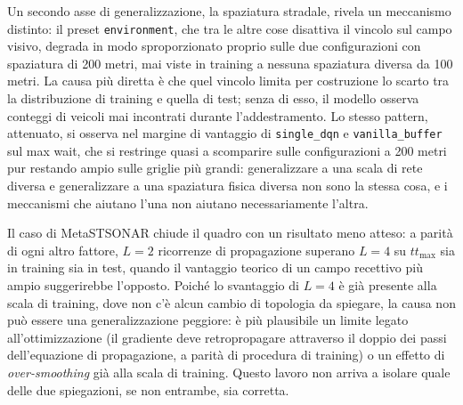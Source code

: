 Un secondo asse di generalizzazione, la spaziatura stradale, rivela un
meccanismo distinto: il preset \texttt{environment}, che tra le altre cose
disattiva il vincolo sul campo visivo, degrada in modo sproporzionato
proprio sulle due configurazioni con spaziatura di 200 metri, mai viste in
training a nessuna spaziatura diversa da 100 metri. La causa più diretta è
che quel vincolo limita per costruzione lo scarto tra la distribuzione di
training e quella di test; senza di esso, il modello osserva conteggi di
veicoli mai incontrati durante l'addestramento. Lo stesso pattern,
attenuato, si osserva nel margine di vantaggio di \texttt{single\_dqn} e
\texttt{vanilla\_buffer} sul max wait, che si restringe quasi a scomparire
sulle configurazioni a 200 metri pur restando ampio sulle griglie più
grandi: generalizzare a una scala di rete diversa e generalizzare a una
spaziatura fisica diversa non sono la stessa cosa, e i meccanismi che
aiutano l'una non aiutano necessariamente l'altra.

Il caso di MetaSTSONAR chiude il quadro con un risultato meno atteso: a
parità di ogni altro fattore, $L=2$ ricorrenze di propagazione superano
$L=4$ su $tt_{\max}$ sia in training sia in test, quando il vantaggio
teorico di un campo recettivo più ampio suggerirebbe l'opposto. Poiché lo
svantaggio di $L=4$ è già presente alla scala di training, dove non c'è
alcun cambio di topologia da spiegare, la causa non può essere una
generalizzazione peggiore: è più plausibile un limite legato
all'ottimizzazione (il gradiente deve retropropagare attraverso il doppio
dei passi dell'equazione di propagazione, a parità di procedura di
training) o un effetto di \emph{over-smoothing} già alla scala di
training. Questo lavoro non arriva a isolare quale delle due spiegazioni,
se non entrambe, sia corretta.

